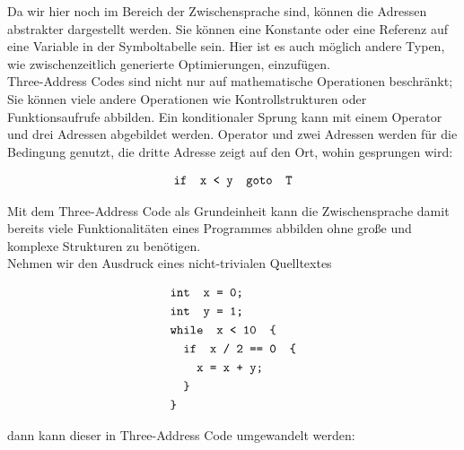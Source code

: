 Da wir hier noch im Bereich der Zwischensprache sind, können die Adressen abstrakter dargestellt werden.
Sie können eine Konstante oder eine Referenz auf eine Variable in der Symboltabelle sein.
Hier ist es auch möglich andere Typen, wie zwischenzeitlich generierte Optimierungen, einzufügen\cite{aho:2006}.\\

Three-Address Codes sind nicht nur auf mathematische Operationen beschränkt;
Sie können viele andere Operationen wie Kontrollstrukturen oder Funktionsaufrufe abbilden.
Ein konditionaler Sprung kann mit einem Operator und drei Adressen abgebildet werden.
Operator und zwei Adressen werden für die Bedingung genutzt, die dritte Adresse zeigt auf den Ort, wohin gesprungen wird:

\begin{figure}[H]
  \begin{align*}
    \texttt{\text{if } x < y \text{ goto } T}
  \end{align*}
\end{figure}

Mit dem Three-Address Code als Grundeinheit kann die Zwischensprache damit bereits viele Funktionalitäten eines Programmes abbilden ohne große und komplexe Strukturen zu benötigen.\\
Nehmen wir den Ausdruck eines nicht-trivialen Quelltextes

\begin{figure}[H]
  \begin{align*}
    &\texttt{\text{int } x = 0;}\\
    &\texttt{\text{int } y = 1;}\\
    &\texttt{\text{while } x < 10 \text{ \{}}\\
    &\texttt{\quad\text{if } x\ /\ 2\ ==\ 0 \text{ \{}}\\
    &\texttt{\quad\quad x = x + y;}\\
    &\texttt{\quad\text{\}}}\\
    &\texttt{\text{\}}}
  \end{align*}
\end{figure}

dann kann dieser in Three-Address Code umgewandelt werden:



